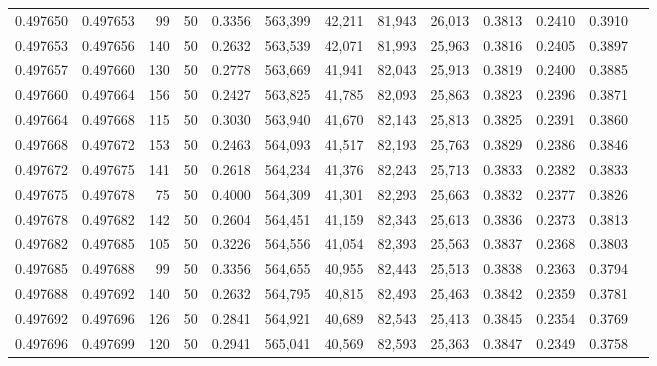 \begin{tabular}{rrrrrrrrrrrrr}
0.497650 & 0.497653 &    99 &  50 &                                     0.3356 & 563,399 &  42,211 &  81,943 &  26,013 & 0.3813 & 0.2410 & 0.3910 \\
0.497653 & 0.497656 &   140 &  50 &                                     0.2632 & 563,539 &  42,071 &  81,993 &  25,963 & 0.3816 & 0.2405 & 0.3897 \\
0.497657 & 0.497660 &   130 &  50 &                                     0.2778 & 563,669 &  41,941 &  82,043 &  25,913 & 0.3819 & 0.2400 & 0.3885 \\
0.497660 & 0.497664 &   156 &  50 &                                     0.2427 & 563,825 &  41,785 &  82,093 &  25,863 & 0.3823 & 0.2396 & 0.3871 \\
0.497664 & 0.497668 &   115 &  50 &                                     0.3030 & 563,940 &  41,670 &  82,143 &  25,813 & 0.3825 & 0.2391 & 0.3860 \\
0.497668 & 0.497672 &   153 &  50 &                                     0.2463 & 564,093 &  41,517 &  82,193 &  25,763 & 0.3829 & 0.2386 & 0.3846 \\
0.497672 & 0.497675 &   141 &  50 &                                     0.2618 & 564,234 &  41,376 &  82,243 &  25,713 & 0.3833 & 0.2382 & 0.3833 \\
0.497675 & 0.497678 &    75 &  50 &                                     0.4000 & 564,309 &  41,301 &  82,293 &  25,663 & 0.3832 & 0.2377 & 0.3826 \\
0.497678 & 0.497682 &   142 &  50 &                                     0.2604 & 564,451 &  41,159 &  82,343 &  25,613 & 0.3836 & 0.2373 & 0.3813 \\
0.497682 & 0.497685 &   105 &  50 &                                     0.3226 & 564,556 &  41,054 &  82,393 &  25,563 & 0.3837 & 0.2368 & 0.3803 \\
0.497685 & 0.497688 &    99 &  50 &                                     0.3356 & 564,655 &  40,955 &  82,443 &  25,513 & 0.3838 & 0.2363 & 0.3794 \\
0.497688 & 0.497692 &   140 &  50 &                                     0.2632 & 564,795 &  40,815 &  82,493 &  25,463 & 0.3842 & 0.2359 & 0.3781 \\
0.497692 & 0.497696 &   126 &  50 &                                     0.2841 & 564,921 &  40,689 &  82,543 &  25,413 & 0.3845 & 0.2354 & 0.3769 \\
0.497696 & 0.497699 &   120 &  50 &                                     0.2941 & 565,041 &  40,569 &  82,593 &  25,363 & 0.3847 & 0.2349 & 0.3758 \\

\end{tabular}
